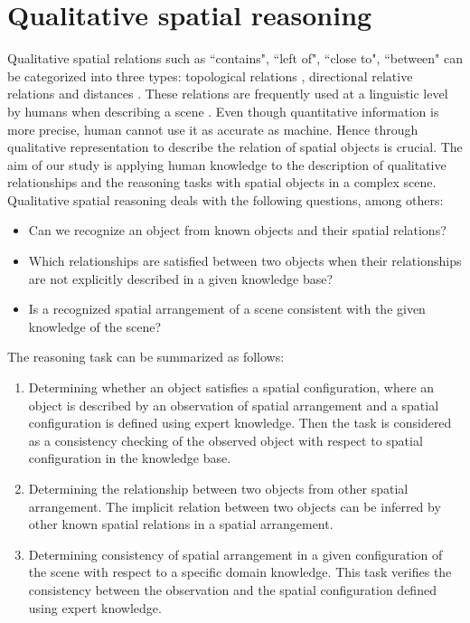 \documentclass{article}
\begin{document}
\section{Qualitative spatial reasoning}\label{sec:qsr}
Qualitative spatial relations such as ``contains", ``left of", ``close to", ``between" can be categorized into three types: topological relations \cite{kuipers1978modeling}, 
directional relative relations and distances \cite{freeman1975modelling}. 
These relations are frequently used at a linguistic level by humans when describing a scene \cite{freksa1991qualitative}.
Even though quantitative information is more precise, human cannot use it as accurate as machine.
Hence through qualitative representation to describe the relation of spatial objects is crucial.
The aim of our study is applying human knowledge to the description of qualitative relationships and the reasoning tasks with spatial objects in a complex scene.
Qualitative spatial reasoning deals with the following questions, among others:
 \begin{itemize}
  \item Can we recognize an object from known objects and their spatial relations?
  \item Which relationships are satisfied between two objects when their relationships are not explicitly described in a given  knowledge base?
  \item Is a recognized spatial arrangement of a scene consistent with the given knowledge of the scene?
 \end{itemize}
 
 The reasoning task can be summarized as follows:
 \begin{enumerate}
  \item Determining whether an object satisfies a spatial configuration, where an object is described by an observation of spatial arrangement and 
  a spatial configuration is defined using expert knowledge. Then the task is considered as a consistency checking  of the observed object with respect to spatial configuration in 
  the knowledge base.
  \item Determining the relationship between two objects from other spatial arrangement. The implicit relation between two objects can be inferred by other known spatial relations
  in a spatial arrangement.
  \item Determining consistency of spatial arrangement in a given configuration of the scene with respect to a specific domain knowledge. This task verifies the consistency
  between the observation and the spatial configuration defined using expert knowledge.
 \end{enumerate}
\end{document}
